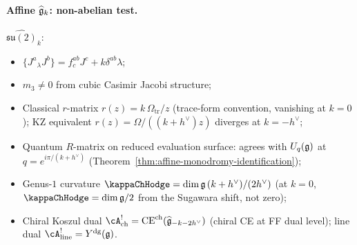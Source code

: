 \paragraph{Affine $\widehat{\mathfrak{g}}_k$: non-abelian test.}
$\widehat{\mathfrak{su}(2)}_k$:
\begin{itemize}
\item $\{J^a {}_\lambda J^b\} = f^{ab}_c J^c + k \delta^{ab}\lambda$;
\item $m_3 \neq 0$ from cubic Casimir Jacobi structure;
\item Classical $r$-matrix $r(z) = k\,\Omega_{\mathrm{tr}}/z$ (trace-form
 convention, vanishing at $k = 0$); KZ equivalent
 $r(z) = \Omega/((k+h^\vee)z)$ diverges at $k = -h^\vee$;
\item Quantum $R$-matrix on reduced evaluation surface: agrees
 with $U_q(\mathfrak{g})$ at $q = e^{i\pi/(k+h^\vee)}$
 (Theorem~\ref{thm:affine-monodromy-identification});
\item Genus-$1$ curvature
 $\kappaChHodge = \dim\fg\,(k+h^\vee)/(2h^\vee)$
 (at $k = 0$, $\kappaChHodge = \dim\fg/2$ from the
 Sugawara shift, not zero);
\item Chiral Koszul dual
 $\cA^!_{\mathrm{ch}} = \mathrm{CE}^{\mathrm{ch}}(\widehat{\fg}_{-k-2h^\vee})$
 (chiral CE at FF dual level); line dual
 $\cA^!_{\mathrm{line}} = \Ydg(\fg)$.
\end{itemize}


